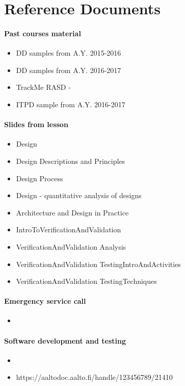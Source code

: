 \section{Reference Documents}
\paragraph{Past courses material}
\begin{itemize}
\item DD samples from A.Y. 2015-2016
\item DD samples from A.Y. 2016-2017
\item TrackMe RASD - 
\item ITPD sample from A.Y. 2016-2017
\end{itemize}

\paragraph{Slides from lesson}
\begin{itemize}
  \item Design	
  \item Design Descriptions and Principles	
  \item Design Process		
  \item Design - quantitative analysis of designs	
  \item Architecture and Design in Practice	 
  \item IntroToVerificationAndValidation	
  \item VerificationAndValidation Analysis	
  \item VerificationAndValidation TestingIntroAndActivities	
  \item VerificationAndValidation TestingTechniques
\end{itemize}

\paragraph{Emergency service call}
\begin{itemize}
\item {}
\end{itemize}

\paragraph{Software development and testing}
\begin{itemize}
\item {}
\item{https://aaltodoc.aalto.fi/handle/123456789/21410}
\end{itemize}

